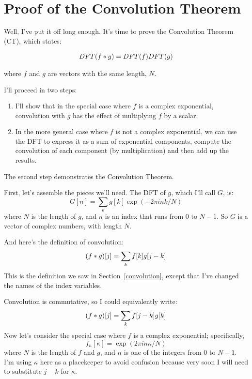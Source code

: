 \documentclass[12pt]{book}
\begin{document}
\section{Proof of the Convolution Theorem}

Well, I've put it off long enough.  It's time to prove the Convolution
Theorem (CT), which states:

\[ DFT(f \ast g) = DFT(f) DFT(g) \]

where $f$ and $g$ are vectors with the same length, $N$.

I'll proceed in two steps:

\begin{enumerate}

\item I'll show that in the special case where $f$ is a complex
exponential, convolution with $g$ has the effect of multiplying
$f$ by a scalar.  

\item In the more general case where $f$ is not a complex exponential,
we can use the DFT to express it as a sum of exponential components,
compute the convolution of each component (by multiplication) and
then add up the results.

\end{enumerate}

The second step demonstrates the Convolution Theorem.

First, let's assemble the pieces we'll need.
The DFT of $g$, which I'll call $G$, is:
%
\[ G[n] = \sum_k g[k] \exp(-2 \pi i n k / N) \]
%
where $N$ is the length of $g$, and $n$ is an index that runs from 0
to $N-1$.  So $G$ is a vector of complex numbers, with length $N$.

And here's the definition of convolution:
%
\[ (f \ast g)[j] = \sum_k f[k] g[j-k] \]
%
This is the definition we saw in Section~\ref{convolution}, except
that I've changed the names of the index variables.

Convolution is commutative, so I could equivalently write:
%
\[ (f \ast g)[j] = \sum_k f[j-k] g[k] \]
%
Now let's consider the special case where $f$ is a complex
exponential; specifically,
%
\[ f_n[\kappa] = \exp(2 \pi i n \kappa / N) \]
%
where $N$ is the length of $f$ and $g$, and
$n$ is one of the integers from 0 to $N-1$.  I'm using
$\kappa$ here as a placekeeper to avoid confusion because
very soon I will need to substitute $j-k$ for $\kappa$.
\end{document}
